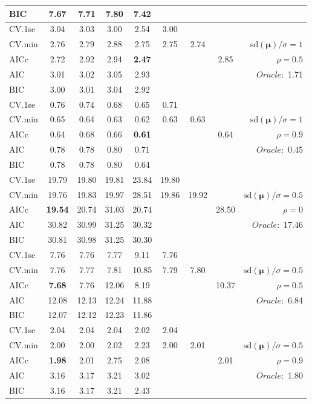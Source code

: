 \begin{table}
\begin{center}
\begin{tabular}{l*{7}{c}|r}
BIC & 7.67 & 7.71 & 7.80 & 7.42 & & & &  \\
 \hline 
CV.1se & 3.04 & 3.03 & 3.00 & 2.54 & 3.00 & & & \\
CV.min & 2.76 & 2.79 & 2.88 & 2.75 & 2.75 & 2.74 & & $\mathrm{sd}(\mathbf{\mu})/\sigma=1$ \\
AICc & 2.72 & 2.92 & 2.94 & {\bf 2.47} & & & 2.85 &  $\rho=0.5$ \\
AIC & 3.01 & 3.02 & 3.05 & 2.93 & & & &  \multirow{2}{*}{$Oracle: $ 1.71} \\
BIC & 3.00 & 3.01 & 3.04 & 2.92 & & & &  \\
 \hline 
CV.1se & 0.76 & 0.74 & 0.68 & 0.65 & 0.71 & & & \\
CV.min & 0.65 & 0.64 & 0.63 & 0.62 & 0.63 & 0.63 & & $\mathrm{sd}(\mathbf{\mu})/\sigma=1$ \\
AICc & 0.64 & 0.68 & 0.66 & {\bf 0.61} & & & 0.64 &  $\rho=0.9$ \\
AIC & 0.78 & 0.78 & 0.80 & 0.71 & & & &  \multirow{2}{*}{$Oracle: $ 0.45} \\
BIC & 0.78 & 0.78 & 0.80 & 0.64 & & & &  \\
 \hline 
CV.1se & 19.79 & 19.80 & 19.81 & 23.84 & 19.80 & & & \\
CV.min & 19.76 & 19.83 & 19.97 & 28.51 & 19.86 & 19.92 & & $\mathrm{sd}(\mathbf{\mu})/\sigma=0.5$ \\
AICc & {\bf 19.54} & 20.74 & 31.03 & 20.74 & & & 28.50 &  $\rho=0$ \\
AIC & 30.82 & 30.99 & 31.25 & 30.32 & & & &  \multirow{2}{*}{$Oracle: $ 17.46} \\
BIC & 30.81 & 30.98 & 31.25 & 30.30 & & & &  \\
 \hline 
CV.1se & 7.76 & 7.76 & 7.77 & 9.11 & 7.76 & & & \\
CV.min & 7.76 & 7.77 & 7.81 & 10.85 & 7.79 & 7.80 & & $\mathrm{sd}(\mathbf{\mu})/\sigma=0.5$ \\
AICc & {\bf 7.68} & 7.76 & 12.06 & 8.19 & & & 10.37 &  $\rho=0.5$ \\
AIC & 12.08 & 12.13 & 12.24 & 11.88 & & & &  \multirow{2}{*}{$Oracle: $ 6.84} \\
BIC & 12.07 & 12.12 & 12.23 & 11.86 & & & &  \\
 \hline 
CV.1se & 2.04 & 2.04 & 2.04 & 2.02 & 2.04 & & & \\
CV.min & 2.00 & 2.00 & 2.02 & 2.23 & 2.00 & 2.01 & & $\mathrm{sd}(\mathbf{\mu})/\sigma=0.5$ \\
AICc & {\bf 1.98} & 2.01 & 2.75 & 2.08 & & & 2.01 &  $\rho=0.9$ \\
AIC & 3.16 & 3.17 & 3.21 & 3.02 & & & &  \multirow{2}{*}{$Oracle: $ 1.80} \\
BIC & 3.16 & 3.17 & 3.21 & 2.43 & & & &  \\
 \hline 
\end{tabular}
\end{center}
\vspace{-1cm}
\end{table}




